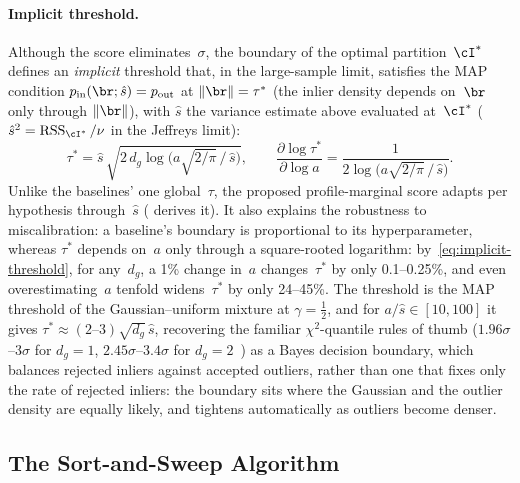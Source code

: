 \documentclass{article}
\DeclareMathOperator{\RSS}{RSS}
\newcommand{\pin}{p_{\mathrm{in}}}
\newcommand{\pout}{p_{\mathrm{out}}}
\newcommand{\gaussunif}{Gaussian--uniform\xspace}
\begin{document}
\paragraph{Implicit threshold.}
Although the score eliminates~$\sigma$, the boundary of the optimal
partition~$\cI^*$ defines an \emph{implicit} threshold that, in the
large-sample limit, satisfies the MAP condition $\pin(\br;\hat s) =
	\pout$ at $\|\br\| = \tau^*$ (the inlier density depends on~$\br$ only
through $\|\br\|$), with $\hat s$ the variance estimate above evaluated at~$\cI^*$
($\hat s^2 = \RSS_{\cI^*}/\nu$ in the Jeffreys limit):
\begin{equation}
	\tau^* = \hat s\,\sqrt{2\,d_g\log\bigl(a\sqrt{2/\pi}\,/\,\hat s\bigr)},
	\qquad
	\frac{\partial\log\tau^*}{\partial\log a}
	= \frac{1}{2\log\bigl(a\sqrt{2/\pi}\,/\,\hat s\bigr)}.
	\label{eq:implicit-threshold}
\end{equation}
Unlike the baselines' one global~$\tau$, the proposed profile-marginal
score adapts per hypothesis through~$\hat s$
( derives it).  It also
explains the robustness to miscalibration: a baseline's boundary is
proportional to its hyperparameter, whereas $\tau^*$ depends on~$a$
only through a square-rooted logarithm:
by~\eqref{eq:implicit-threshold}, for any~$d_g$, a 1\% change in~$a$
changes~$\tau^*$ by only 0.1--0.25\%, and even overestimating~$a$ tenfold widens~$\tau^*$ by
only 24--45\%.  The threshold is the MAP threshold of the \gaussunif mixture at
$\gamma = \tfrac12$,
and for $a/\hat s \in [10, 100]$ it gives
$\tau^* \approx (2\text{--}3)\sqrt{d_g}\,\hat s$, recovering the familiar
$\chi^2$-quantile rules of thumb ($1.96\sigma$--$3\sigma$ for $d_g = 1$,
$2.45\sigma$--$3.4\sigma$ for $d_g = 2$~\cite{Hartley2003}) as a
Bayes decision boundary, which balances rejected inliers against
accepted outliers, rather than one that fixes only the rate of rejected
inliers: the
boundary sits where the Gaussian and the outlier density are equally
likely, and tightens automatically as outliers become denser.

\subsection{The Sort-and-Sweep Algorithm}
\end{document}
